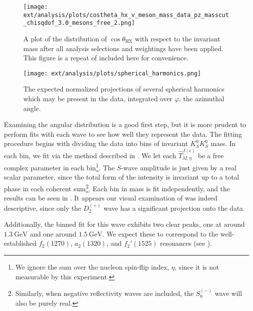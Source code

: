 \begin{figure}
  \begin{center}
    \texttt{[image: ext/analysis/plots/costheta\_hx\_v\_meson\_mass\_data\_pz\_masscut\_chisqdof\_3.0\_mesons\_free\_2.png]}
  \end{center}
  \caption{A plot of the distribution of $\cos\theta_\text{HX}$ with respect to the invariant mass after all analysis selections and weightings have been applied. This figure is a repeat of  included here for convenience.}\label{fig:costheta-vs-mass}
\end{figure}

\begin{figure}
  \begin{center}
    \texttt{[image: ext/analysis/plots/spherical\_harmonics.png]}
  \end{center}
  \caption{The expected normalized projections of several spherical harmonics which may be present in the data, integrated over $\varphi$, the azimuthal angle.}\label{fig:spherical-harmonics}
\end{figure}

Examining the angular distribution is a good first step, but it is more prudent to perform fits with each wave to see how well they represent the data. The fitting procedure begins with dividing the data into bins of invariant $K_S^0K_S^0$ mass. In each bin, we fit  via the method described in . We let each $\hat{T}_{M;\eta}^{J(\epsilon)}$ be a free complex parameter in each bin\footnote{We ignore the sum over the nucleon spin-flip index, $\eta$, since it is not measurable by this experiment.}. The $S$-wave amplitude is just given by a real scalar parameter, since the total form of the intensity is invariant up to a total phase in each coherent sum\footnote{Similarly, when negative reflectivity waves are included, the $S_0^{(-)}$ wave will also be purely real.}. Each bin in mass is fit independently, and the results can be seen in . It appears our visual examination of  was indeed descriptive, since only the $D_2^{(+)}$ wave has a significant projection onto the data.

Additionally, the binned fit for this wave exhibits two clear peaks, one at around $\SI{1.3}{\giga\electronvolt}$ and one around $\SI{1.5}{\giga\electronvolt}$. We expect these to correspond to the well-established $f_2(1270)$, $a_2(1320)$, and $f_2'(1525)$ resonances (see ). 


